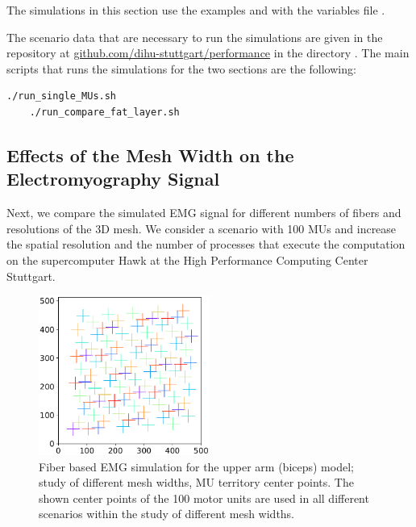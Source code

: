 \begin{reproduce}
  The simulations in this section use the examples  and  with the variables file .

  The scenario data that are necessary to run the simulations are given in the repository at \href{https://github.com/dihu-stuttgart/performance}{github.com/dihu-stuttgart/performance}
  in the directory . The main scripts that runs the simulations for the two sections are the following:
  \begin{lstlisting}[columns=fullflexible,breaklines=true,postbreak=\mbox{\textcolor{gray}{$\hookrightarrow$}\space}]
    ./run_single_MUs.sh
    ./run_compare_fat_layer.sh
  \end{lstlisting}
\end{reproduce}


\subsection{Effects of the Mesh Width on the Electromyography Signal}\label{sec:effects_of_the_mesh_width_emg}

Next, we compare the simulated EMG signal for different numbers of fibers and resolutions of the 3D mesh. We consider a scenario with 100 MUs and increase the spatial resolution and the number of processes that execute the computation on the supercomputer Hawk at the High Performance Computing Center Stuttgart.

\begin{figure}
  \centering%
  \includegraphics[width=0.5\textwidth]{images/results/application/MU_fibre_distribution_523x523_100mus_txt_mu_positions.pdf}%
  \caption{Fiber based EMG simulation for the upper arm (biceps) model; study of different mesh widths, MU territory center points. The shown center points of the 100 motor units are used in all different scenarios within the study of different mesh widths.}%
  \label{fig:MU_fibre_distribution_523x523_100mus_txt_mu_positions}%
\end{figure}


